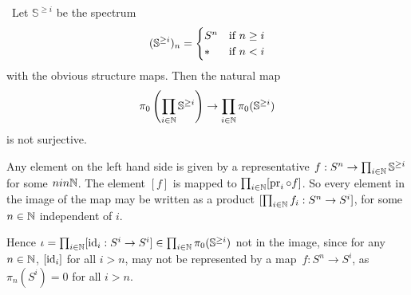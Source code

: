 
\def \L{\mathbb{L}}
\def \S{\mathbb{S}}
\def \O{\mathcal{O}}

\def \Sp{\textit{Sp}}
\def \SMod{\S\text{-}\hspace{-.15em}\Mod}

\def \smsh {\wedge}

\renewcommand{\Xi}{{\mbox{\larger[2]$\pmb\xi$}}}


\mmaketitle

\begin{exercise}[1]\ 
Let $\S^{\ge i}$ be the spectrum 
\[ (\S^{\ge i})_n = \pwf{S^n &\tif n \ge i \\ * &\tif n < i} \]
with the obvious structure maps. 
Then the natural map 
\[ \pi_0\left( \prod_{i\in\N} \S^{\ge i} \right) \to 
    \prod_{i\in\N} \pi_0(\S^{\ge i}) \]
is not surjective.

Any element on the left hand side is given by a representative 
$f : S^n \to \prod_{i\in\N} \S^{\ge i}$ for some $n in \mathbb{N}$.
The element $[f]$ is mapped to $\prod_{i\in\mathbb{N}} [\operatorname{pr}_i \circ f]$. So every
element in the image of the map may be written as a product $[\prod_{i\in\mathbb{N}}
f_i : S^n \to S^i]$, for some $n\in \mathbb{N}$ independent of $i$.

Hence $\iota = \prod_{i\in\N} [\id_i : S^i \to S^i] \in \prod_{i\in\N}
\pi_0(\S^{\ge i})$ not in the image, since for any $n\in \mathbb{N}$, $[\operatorname{id}_i]$ for
all $i > n$, may not be represented by a map $f : S^n \to S^i$, as $\pi_n(S^i)
= 0$ for all $i > n$.
\end{exercise}


